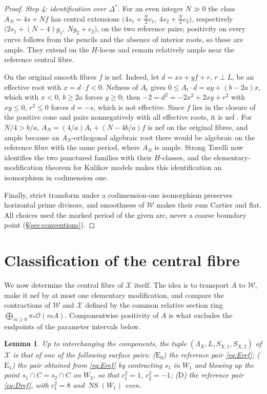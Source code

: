 \documentclass[11pt]{article}
\newcommand{\NS}{\operatorname{NS}}
\newcommand{\calX}{\mathcal X}
\newcommand{\calW}{\mathcal W}
\newtheorem{lemma}[theorem]{Lemma}
\theoremstyle{definition}
\theoremstyle{remark}
\begin{document}
\begin{proof}
\emph{Step 4: identification over \(\Delta^*\).}
For an even integer \(N\gg0\) the class \(A_N=4s+Nf\) has central
extensions \(\bigl(4s_1+\tfrac N2c_1,\ 4s_2+\tfrac N2c_2\bigr)\),
respectively \(\bigl(2s_1+(N-4)g_1,\ Ng_2+c_2\bigr)\), on the two
reference pairs; positivity on every curve follows from the pencils
and the absence of interior roots, so these are ample. They extend on
the \(H\)-locus and remain relatively ample near the reference central
fibre.

On the original smooth fibres \(f\) is nef. Indeed, let
\(d=xs+yf+r\), \(r\perp L\), be an effective root with
\(x=d\cdot f<0\). Nefness of \(A_t\) gives
\(0\leq A_t\cdot d=ay+(b-2a)x\), which with \(x<0\), \(b\geq2a\)
forces \(y\geq0\); then \(-2=d^2=-2x^2+2xy+r^2\) with \(xy\leq0\),
\(r^2\leq0\) forces \(d=-s\), which is not effective. Since \(f\) lies
in the closure of the positive cone and pairs nonnegatively with all
effective roots, it is nef \cite[Ch.~8]{Hu}. For \(N/4>b/a\),
\(A_N=(4/a)A_t+(N-4b/a)f\) is nef on the original fibres, and ample
because an \(A_N\)-orthogonal algebraic root there would be algebraic
on the reference fibre with the same period, where \(A_N\) is ample.
Strong Torelli \cite[Theorem~2.3]{AE} now identifies the two punctured
families with their \(H\)-classes, and the elementary-modification
theorem for Kulikov models \cite[Corollary~3.1]{SB} makes this
identification an isomorphism in codimension one.

Finally, strict transform under a codimension-one isomorphism
preserves horizontal prime divisors, and smoothness of \(\calW\) makes
their sum Cartier and flat. All choices used the marked period of the
given arc, never a coarse boundary point (\S\ref{sec:conventions}).
\end{proof}

\section{Classification of the central fibre}\label{sec:models}

We now determine the central fibre of \(\calX\) itself. The idea is to
transport \(A\) to \(\calW\), make it nef by at most one elementary
modification, and compare the contractions of \(\calW\) and \(\calX\)
defined by the common relative section ring
\(\bigoplus_{m\ge0}\pi_*\mathcal O(mA)\). Componentwise positivity
of \(A\) is what excludes the endpoints of the parameter intervals
below.

\begin{lemma}\label{lem:models}
Up to interchanging the components, the tuple
\((\Lambda_X,L,S_{X,1},S_{X,2})\) of \(\calX\) is that of one of the
following surface pairs:
(\(\mathrm E_0\)) the reference pair \eqref{eq:Eref};
(\(\mathrm E_1\)) the pair obtained from \eqref{eq:Eref} by
contracting \(s_1\) in \(W_1\) and blowing up the point
\(s_1\cap C=s_2\cap C\) on \(W_2\), so that \(c_1^2=1\), \(c_2^2=-1\);
(\(\mathrm D\)) the reference pair \eqref{eq:Dref}, with
\(c_1^2=8\) and \(\NS(W_1)\) even.
\end{lemma}
\end{document}
